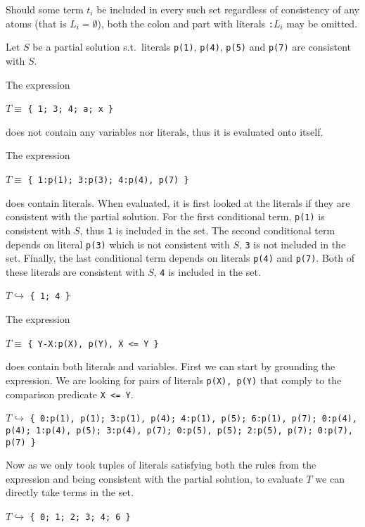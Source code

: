 Should some term $t_i$ be included in every such set regardless of consistency of any atoms
(that is $L_i = \emptyset$),
both the colon and part with literals \texttt{:$L_i$} may be omitted.

\begin{example}\label{exp:aggregate_expressions}
    Let $S$ be a partial solution s.t.\ literals \texttt{p(1)}, \texttt{p(4)},
    \texttt{p(5)} and \texttt{p(7)} are consistent with $S$.

    The expression
    \begin{center}
        $T \equiv$ \texttt{\{ 1; 3; 4; a; x \}}  %
    \end{center}
    does not contain any variables nor literals, thus it is evaluated onto itself.

    The expression
    \begin{center}
        $T \equiv$ \texttt{\{ 1:p(1); 3:p(3); 4:p(4), p(7) \}}  %
    \end{center}
    does contain literals. When evaluated, it is first looked at the literals if they are
    consistent with the partial solution. For the first conditional term,
    \texttt{p(1)} is consistent with $S$, thus \texttt{1} is included in the set.
    The second conditional term depends on literal \texttt{p(3)} which is not consistent
    with $S$, \texttt{3} is not included in the set.
    Finally, the last conditional term depends on literals \texttt{p(4)} and \texttt{p(7)}.
    Both of these literals are consistent with $S$, \texttt{4} is included in the set.
    \begin{center}
        $T \hookrightarrow$ \texttt{\{ 1; 4 \}}  %
    \end{center}

    The expression
    \begin{center}
        $T \equiv$ \texttt{\{ Y-X:p(X), p(Y), X <= Y \}}  %
    \end{center}
    does contain both literals and variables. First we can start by grounding the expression.
    We are looking for pairs of literals \texttt{p(X), p(Y)} that comply to the comparison
    predicate \texttt{X <= Y}.
    \begin{center}
        $T\hookrightarrow$ \texttt{\{ 0:p(1), p(1); 3:p(1), p(4); 4:p(1), p(5); 6:p(1), p(7); 0:p(4), p(4); 1:p(4), p(5); 3:p(4), p(7); 0:p(5), p(5); 2:p(5), p(7); 0:p(7), p(7) \}}  %
    \end{center}
    Now as we only took tuples of literals satisfying both the rules from the expression
    and being consistent with the partial solution, to evaluate $T$ we can directly
    take terms in the set.
    \begin{center}
        $T\hookrightarrow$ \texttt{\{ 0; 1; 2; 3; 4; 6 \}}  %
    \end{center}


\end{example}
